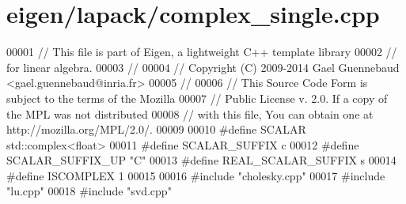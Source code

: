 \hypertarget{eigen_2lapack_2complex__single_8cpp_source}{}\section{eigen/lapack/complex\+\_\+single.cpp}
\label{eigen_2lapack_2complex__single_8cpp_source}

\begin{DoxyCode}
00001 \textcolor{comment}{// This file is part of Eigen, a lightweight C++ template library}
00002 \textcolor{comment}{// for linear algebra.}
00003 \textcolor{comment}{//}
00004 \textcolor{comment}{// Copyright (C) 2009-2014 Gael Guennebaud <gael.guennebaud@inria.fr>}
00005 \textcolor{comment}{//}
00006 \textcolor{comment}{// This Source Code Form is subject to the terms of the Mozilla}
00007 \textcolor{comment}{// Public License v. 2.0. If a copy of the MPL was not distributed}
00008 \textcolor{comment}{// with this file, You can obtain one at http://mozilla.org/MPL/2.0/.}
00009 
00010 \textcolor{preprocessor}{#define SCALAR        std::complex<float>}
00011 \textcolor{preprocessor}{#define SCALAR\_SUFFIX c}
00012 \textcolor{preprocessor}{#define SCALAR\_SUFFIX\_UP "C"}
00013 \textcolor{preprocessor}{#define REAL\_SCALAR\_SUFFIX s}
00014 \textcolor{preprocessor}{#define ISCOMPLEX     1}
00015 
00016 \textcolor{preprocessor}{#include "cholesky.cpp"}
00017 \textcolor{preprocessor}{#include "lu.cpp"}
00018 \textcolor{preprocessor}{#include "svd.cpp"}
\end{DoxyCode}
